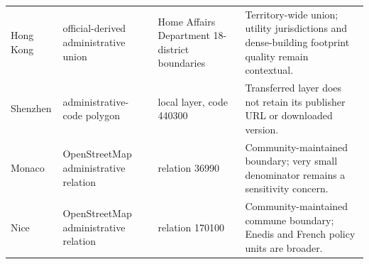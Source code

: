 \begin{tabular}{@{}>{\raggedright\arraybackslash}p{1.2cm}>{\raggedright\arraybackslash}p{3.0cm}>{\raggedright\arraybackslash}p{4.1cm}>{\raggedright\arraybackslash}p{6.0cm}@{}}
Hong Kong & official-derived administrative union & Home Affairs Department 18-district boundaries & Territory-wide union; utility jurisdictions and dense-building footprint quality remain contextual. \\
Shenzhen & administrative-code polygon & local layer, code 440300 & Transferred layer does not retain its publisher URL or downloaded version. \\
Monaco & OpenStreetMap administrative relation & relation 36990 & Community-maintained boundary; very small denominator remains a sensitivity concern. \\
Nice & OpenStreetMap administrative relation & relation 170100 & Community-maintained commune boundary; Enedis and French policy units are broader. \\
\bottomrule
\end{tabular}
